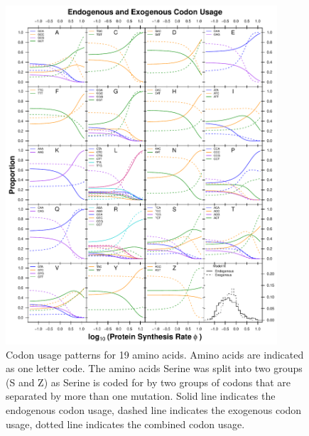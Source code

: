\documentclass[fleqn,letterpaper]{article}
\begin{document}
\begin{figure}
     \centering
	\includegraphics[width=0.9\textwidth]{img/CUB_cleft_main.pdf}
	\caption{Codon usage patterns for 19 amino acids. Amino acids are indicated as one letter code. 
	The amino acids Serine was split into two groups (S and Z) as Serine is coded for by two groups of codons that are separated by more than one mutation.
	Solid line indicates the endogenous codon usage, dashed line indicates the exogenous codon usage, dotted line indicates the combined codon usage.}
	\label{fig:cub_all_sets}
\end{figure}
\end{document}

